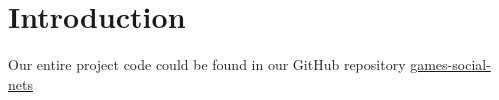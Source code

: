 \section{Introduction}
Our entire project code could be found in our GitHub repository \href{https://github.com/goldmyu/games-social-nets}{games-social-nets}
